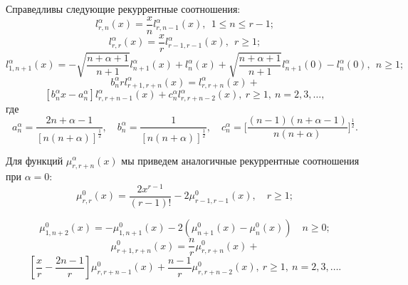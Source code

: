 \begin{theorem}\label{RItheo4}
Справедливы следующие рекуррентные соотношения:
\begin{equation*}\label{Gadz_eq14}
l_{r,n}^\alpha(x)=\frac{x}{n}l_{r,n-1}^\alpha(x), \ \ 1\leq n\leq r-1;
\end{equation*}
\begin{equation*}\label{Gadz_eq15}
l_{r,r}^\alpha(x)=\frac{x}{r}l_{r-1,r-1}^\alpha(x), \ \ r\geq 1;
\end{equation*}
\begin{equation*}\label{Gadz_eq16}
l_{1,n+1}^\alpha(x)=-\sqrt{\frac{n+\alpha+1}{n+1}} l_{n+1}^{\alpha}(x)+l_{n}^{\alpha}(x)+
\sqrt{\frac{n+\alpha+1}{n+1}} l_{n+1}^{\alpha}(0)-l_{n}^{\alpha}(0), \ \ n\geq 1;
\end{equation*}
$$
b_n^\alpha rl_{r+1,r+n}^\alpha(x)=l_{r,r+n}^{\alpha}(x)+
$$
\begin{equation*}\label{Gadz_eq17}
\left[b_n^\alpha x - a_n^\alpha\right]l_{r,r+n-1}^{\alpha}(x)
+c_{n}^\alpha l_{r,r+n-2}^{\alpha}(x), \ r\geq 1, \ n=2, 3, \ldots,
\end{equation*}
где
\begin{equation*}
a_n^\alpha=\frac{2n+\alpha-1}{[n(n+\alpha)]^\frac{1}{2}},\quad
b_n^\alpha=\frac{1}{[n(n+\alpha)]^\frac{1}{2}},\quad
c_n^\alpha=\Big[\frac{(n-1)(n+\alpha-1)}{n(n+\alpha)}\Big]^\frac{1}{2}.
\end{equation*}
\end{theorem}

\noindent Для функций $\mu_{r,r+n}^\alpha(x)$ мы приведем аналогичные рекуррентные соотношения при $\alpha=0$:
\begin{equation*}
\mu_{r,r}^0(x)=\frac{2x^{r-1}}{(r-1)!}-2\mu_{r-1,r-1}^0(x), \quad r\geq1;
\end{equation*}

\begin{equation*}
\mu_{1,n+2}^0(x) = - \mu_{1,n+1}^0(x) - 2 (\mu_{n+1}^0(x) - \mu_{n}^0(x)) \quad n\geq 0;
\end{equation*}
$$
\mu_{r+1,r+n}^0(x)=\frac{n}{r}\mu_{r,r+n}^{0}(x)+
$$
\begin{equation*}
\left[\frac{x}{r} - \frac{2n-1}{r}\right]\mu_{r,r+n-1}^{0}(x)
+\frac{n-1}{r} \mu_{r,r+n-2}^{0}(x), \ r\geq 1, \ n=2, 3, \ldots.
\end{equation*}

